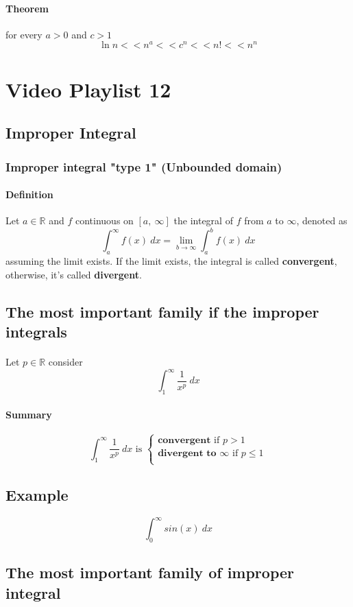 \documentclass{article}
\newcommand{\R}[0]{\mathbb{R}}
\newcommand{\definition}[0]{\paragraph{Definition}}
\begin{document}
\paragraph{Theorem} for every $a > 0$ and $c > 1$
\[
	\ln{n} << n^a << c^n << n! << n^n
\]

\section{Video Playlist 12}
\subsection{Improper Integral}
\subsubsection{Improper integral "type 1" (Unbounded domain)}
\definition Let $a \in \R$ and $f$ continuous on $[a,\ \infty]$ the integral of $f$ from $a$ to $\infty$, denoted as 
\[
	\int_a^{\infty}{f(x)\ dx} = \lim_{b \to \infty}\int_a^b{f(x)\ dx}
\] assuming the limit exists. If the limit exists, the integral is called \textbf{convergent}, otherwise, it's called \textbf{divergent}.

\subsection{The most important family if the improper integrals}
\paragraph{} Let $p \in \R$ consider
\[
	\int_1^{\infty}{\frac{1}{x^p}\ dx}
\]
\paragraph{Summary}
\[
	\int_1^{\infty}{\frac{1}{x^p}\ dx} \text{ is } \begin{cases}
		\textbf{convergent} \text{ if } p > 1 \\
		\textbf{divergent to } \infty \text{ if } p \leq 1 \\
	\end{cases}
\]

\subsection{Example}
\[
	\int_0^{\infty} sin(x)\ dx
\]

\subsection{The most important family of improper integral}
\end{document}
